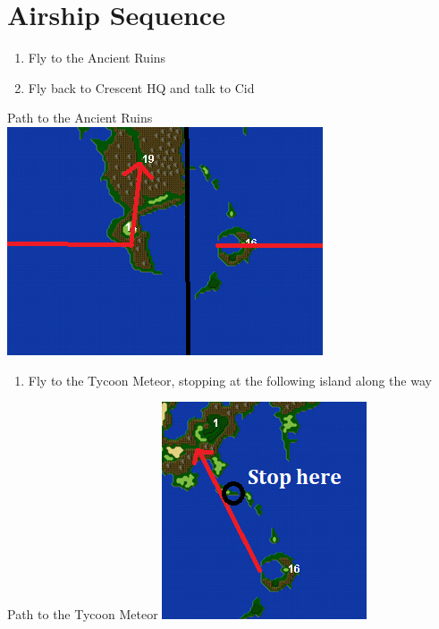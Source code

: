 \chapter{Airship Sequence}

\vspace{\baselineskip}

\begin{paracol}{2}

\begin{enumerate}
    \item Fly to the Ancient Ruins
    \item Fly back to Crescent HQ and talk to Cid
\end{enumerate}

\switchcolumn
\begin{misc}{Path to the Ancient Ruins}
    \includegraphics[scale=0.7]{../Graphics/Maps/5. To Ruins.png}
\end{misc}

\switchcolumn*
\resume
\begin{enumerate}[resume]
    \item Fly to the Tycoon Meteor, stopping at the following island along the way
\end{enumerate}

\switchcolumn
\begin{misc}{Path to the Tycoon Meteor}
    \includegraphics[scale=1.45]{../Graphics/Maps/6. To Tycoon Meteor.png}
\end{misc}


\end{paracol}
